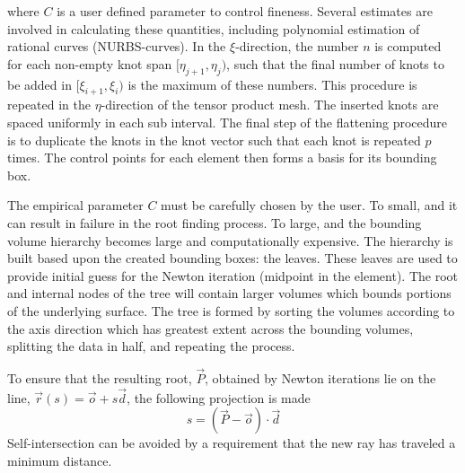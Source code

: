 where $C$ is a user defined parameter to control fineness. Several estimates are involved in calculating these quantities, including polynomial estimation of rational curves (NURBS-curves). In the $\xi$-direction, the number $n$ is computed for each non-empty knot span $[\eta_{j+1},\eta_j)$, such that the final number of knots to be added in $[\xi_{i+1},\xi_i)$ is the maximum of these numbers. This procedure is repeated in the $\eta$-direction of the tensor product mesh. The inserted knots are spaced uniformly in each sub interval. The final step of the flattening procedure is to duplicate the knots in the knot vector such that each knot is repeated $p$ times. The control points for each element then forms a basis for its bounding box.

The empirical parameter $C$ must be carefully chosen by the user. To small, and it can result in failure in the root finding process. To large, and the bounding volume hierarchy becomes large and computationally expensive. The hierarchy is built based upon the created bounding boxes: the leaves. These leaves are used to provide initial guess for the Newton iteration (midpoint in the element). The root and internal nodes of the tree will contain larger volumes which bounds portions of the underlying surface. The tree is formed by sorting the volumes according to the axis direction which has greatest extent across the bounding volumes, splitting the data in half, and repeating the process.

To ensure that the resulting root, $\vec{P}$, obtained by Newton iterations lie on the line, $\vec{r}(s) = \vec{o}+s\vec{d}$, the following projection is made
\begin{equation*}
	s = (\vec{P}-\vec{o})\cdot\vec{d}
\end{equation*}
Self-intersection can be avoided by a requirement that the new ray has traveled a minimum distance.


